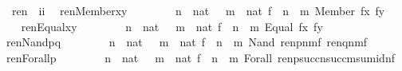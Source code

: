 \begin{isabelle}
\isamarkuptrue%
\isamarkupfalse%
\ \ \ ren\ {\isacharcolon}{\isacharcolon}\ {\isachardoublequoteopen}i{\isacharequal}{\isachargreater}i{\isachardoublequoteclose}\isanewline
{}\isamarkupfalse%
\isanewline
\ \ {\isachardoublequoteopen}ren{\isacharparenleft}Member{\isacharparenleft}x{\isacharcomma}y{\isacharparenright}{\isacharparenright}\ {\isacharequal}\isanewline
\ \ \ \ \ \ {\isacharparenleft}{\isasymlambda}\ n\ {\isasymin}\ nat\ {\isachardot}\ {\isasymlambda}\ m\ {\isasymin}\ nat{\isachardot}\ {\isasymlambda}f\ {\isasymin}\ n\ {\isasymrightarrow}\ m{\isachardot}\ Member\ {\isacharparenleft}f{\isacharbackquote}x{\isacharcomma}\ f{\isacharbackquote}y{\isacharparenright}{\isacharparenright}{\isachardoublequoteclose}\isanewline
\ \ \isanewline
\ \ {\isachardoublequoteopen}ren{\isacharparenleft}Equal{\isacharparenleft}x{\isacharcomma}y{\isacharparenright}{\isacharparenright}\ {\isacharequal}\isanewline
\ \ \ \ \ \ {\isacharparenleft}{\isasymlambda}\ n\ {\isasymin}\ nat\ {\isachardot}\ {\isasymlambda}\ m\ {\isasymin}\ nat{\isachardot}\ {\isasymlambda}f\ {\isasymin}\ n\ {\isasymrightarrow}\ m{\isachardot}\ Equal\ {\isacharparenleft}f{\isacharbackquote}x{\isacharcomma}\ f{\isacharbackquote}y{\isacharparenright}{\isacharparenright}{\isachardoublequoteclose}\isanewline
\ \ \isanewline
\ \ {\isachardoublequoteopen}ren{\isacharparenleft}Nand{\isacharparenleft}p{\isacharcomma}q{\isacharparenright}{\isacharparenright}\ {\isacharequal}\isanewline
\ \ \ \ \ \ {\isacharparenleft}{\isasymlambda}\ n\ {\isasymin}\ nat\ {\isachardot}\ {\isasymlambda}\ m\ {\isasymin}\ nat{\isachardot}\ {\isasymlambda}f\ {\isasymin}\ n\ {\isasymrightarrow}\ m{\isachardot}\ Nand\ {\isacharparenleft}ren{\isacharparenleft}p{\isacharparenright}{\isacharbackquote}n{\isacharbackquote}m{\isacharbackquote}f{\isacharcomma}\ ren{\isacharparenleft}q{\isacharparenright}{\isacharbackquote}n{\isacharbackquote}m{\isacharbackquote}f{\isacharparenright}{\isacharparenright}{\isachardoublequoteclose}\isanewline
\ \ \isanewline
\ \ {\isachardoublequoteopen}ren{\isacharparenleft}Forall{\isacharparenleft}p{\isacharparenright}{\isacharparenright}\ {\isacharequal}\isanewline
\ \ \ \ \ \ {\isacharparenleft}{\isasymlambda}\ n\ {\isasymin}\ nat\ {\isachardot}\ {\isasymlambda}\ m\ {\isasymin}\ nat{\isachardot}\ {\isasymlambda}f\ {\isasymin}\ n\ {\isasymrightarrow}\ m{\isachardot}\ Forall\ {\isacharparenleft}ren{\isacharparenleft}p{\isacharparenright}{\isacharbackquote}succ{\isacharparenleft}n{\isacharparenright}{\isacharbackquote}succ{\isacharparenleft}m{\isacharparenright}{\isacharbackquote}sum{\isacharunderscore}id{\isacharparenleft}n{\isacharcomma}f{\isacharparenright}{\isacharparenright}{\isacharparenright}{\isachardoublequoteclose}
\end{isabelle}


